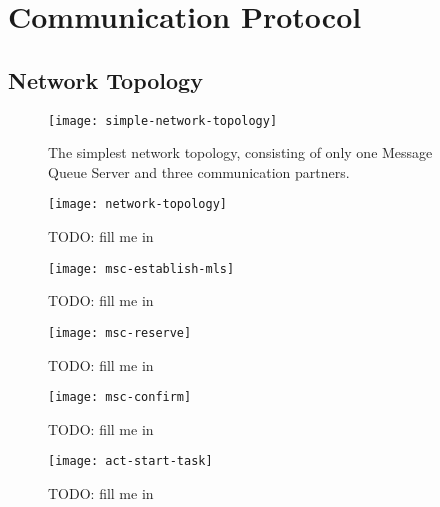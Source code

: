 \chapter{Communication Protocol}
\label{cha:comm-prot}

\section{Network Topology}
\label{sec:network-topology}

\begin{figure}[h]
  \begin{center}
    \texttt{[image: simple-network-topology]}
  \end{center}
  \caption[Network  Topology   (simple)]{The  simplest  network  topology,
    consisting of  only one Message  Queue Server and  three communication
    partners.}
  \label{fig:simple-net-top}
\end{figure}

\begin{figure}[h]
  \begin{center}
    \texttt{[image: network-topology]}
  \end{center}
  \caption[Network  Topology]{TODO: fill me in}
  \label{fig:net-top}
\end{figure}

\begin{figure}[h]
  \begin{center}
    \texttt{[image: msc-establish-mls]}
  \end{center}
  \caption[MSC Message Layer Security]{TODO: fill me in}
  \label{fig:msc-establish-mls}
\end{figure}

\begin{figure}[h]
  \begin{center}
    \texttt{[image: msc-reserve]}
  \end{center}
  \caption[MSC Make Reservation]{TODO: fill me in}
  \label{fig:msc-reserve}
\end{figure}

\begin{figure}[h]
  \begin{center}
    \texttt{[image: msc-confirm]}
  \end{center}
  \caption[MSC Confirm Reservation]{TODO: fill me in}
  \label{fig:msc-confirm}
\end{figure}

\begin{figure}[h]
  \begin{center}
    \texttt{[image: act-start-task]}
  \end{center}
  \caption[Start Task Activity]{TODO: fill me in}
  \label{fig:act-start-task}
\end{figure}

